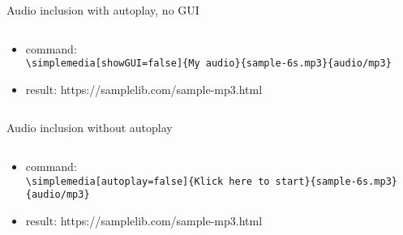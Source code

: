     \begin{frame}{Audio inclusion with autoplay, no GUI}
        \begin{columns}
            \begin{column}[t]{128mm}
                \begin{itemize}
                    \item command:\\
                    \scriptsize 
                    \texttt{\textbackslash{}simplemedia[showGUI=false]\{My audio\}\{sample-6s.mp3\}\{audio/mp3\}}
                    \normalsize
                    \item result:
                    \hspace{0.5cm}\tiny{}https://samplelib.com/sample-mp3.html
                \end{itemize}
            \end{column}
        \end{columns}
    \end{frame}

    \begin{frame}{Audio inclusion without autoplay}
        \begin{columns}
            \begin{column}[t]{128mm}
                \begin{itemize}
                    \item command:\\
                    \scriptsize 
                    \texttt{\textbackslash{}simplemedia[autoplay=false]\{Klick here to start\}\{sample-6s.mp3\}\{audio/mp3\}}
                    \normalsize
                    \item result:
                    \hspace{0.5cm}\tiny{}https://samplelib.com/sample-mp3.html
                \end{itemize}   
            \end{column}
        \end{columns}
    \end{frame}

